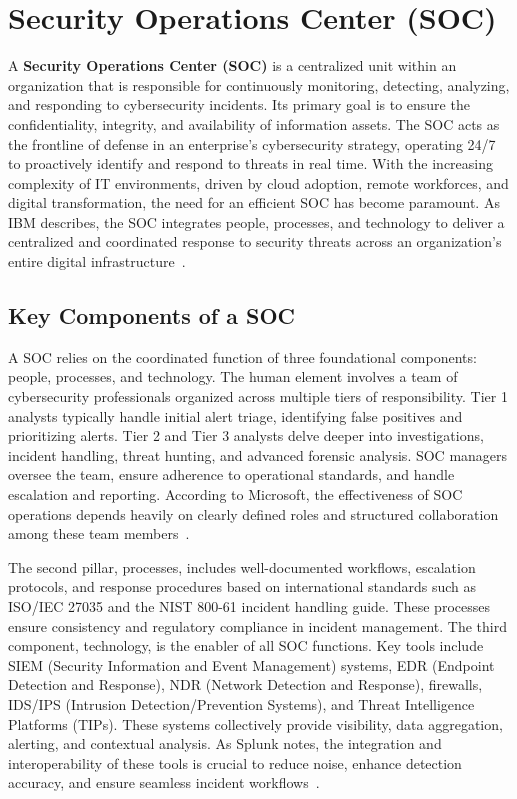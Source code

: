 \section{Security Operations Center (SOC)}\vspace{-0.5em}

A \textbf{Security Operations Center (SOC)} is a centralized unit within an organization that is responsible for continuously monitoring, detecting, analyzing, and responding to cybersecurity incidents. Its primary goal is to ensure the confidentiality, integrity, and availability of information assets. The SOC acts as the frontline of defense in an enterprise’s cybersecurity strategy, operating 24/7 to proactively identify and respond to threats in real time. With the increasing complexity of IT environments, driven by cloud adoption, remote workforces, and digital transformation, the need for an efficient SOC has become paramount. As IBM describes, the SOC integrates people, processes, and technology to deliver a centralized and coordinated response to security threats across an organization’s entire digital infrastructure~\cite{ibm}.

\subsection{Key Components of a SOC}\vspace{-0.5em}

A SOC relies on the coordinated function of three foundational components: people, processes, and technology. The human element involves a team of cybersecurity professionals organized across multiple tiers of responsibility. Tier 1 analysts typically handle initial alert triage, identifying false positives and prioritizing alerts. Tier 2 and Tier 3 analysts delve deeper into investigations, incident handling, threat hunting, and advanced forensic analysis. SOC managers oversee the team, ensure adherence to operational standards, and handle escalation and reporting. According to Microsoft, the effectiveness of SOC operations depends heavily on clearly defined roles and structured collaboration among these team members~\cite{microsoft}. 

The second pillar, processes, includes well-documented workflows, escalation protocols, and response procedures based on international standards such as ISO/IEC 27035 and the NIST 800-61 incident handling guide. These processes ensure consistency and regulatory compliance in incident management. The third component, technology, is the enabler of all SOC functions. Key tools include SIEM (Security Information and Event Management) systems, EDR (Endpoint Detection and Response), NDR (Network Detection and Response), firewalls, IDS/IPS (Intrusion Detection/Prevention Systems), and Threat Intelligence Platforms (TIPs). These systems collectively provide visibility, data aggregation, alerting, and contextual analysis. As Splunk notes, the integration and interoperability of these tools is crucial to reduce noise, enhance detection accuracy, and ensure seamless incident workflows~\cite{splunk}.

